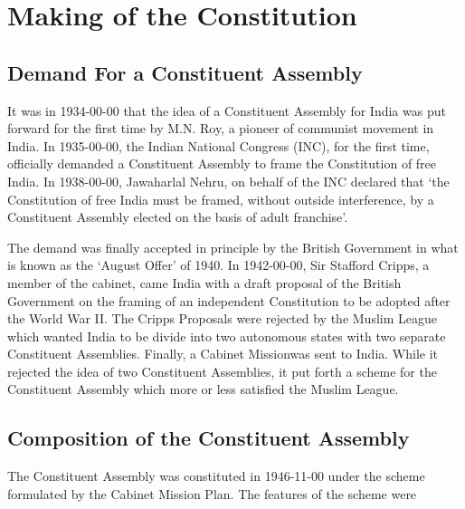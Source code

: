 \chapter{Making of the Constitution}

\begin{multicol}{2}

\section{Demand For a Constituent Assembly}

It was in 1934-00-00 that the idea of a Constituent Assembly for India was put forward for the first time by M.N. Roy, a pioneer of communist movement in India. In 1935-00-00, the Indian National Congress (INC), for the first time, officially demanded a Constituent Assembly to frame the Constitution of free India. In 1938-00-00, Jawaharlal Nehru, on behalf of the INC declared that `the Constitution of free India must be framed, without outside interference, by a Constituent Assembly elected on the basis of adult franchise'.

The demand was finally accepted in principle by the British Government in what is known as the `August Offer' of 1940. In 1942-00-00, Sir Stafford Cripps, a member of the cabinet, came India with a draft proposal of the British Government on the framing of an independent Constitution to be adopted after the World War II. The Cripps Proposals were rejected by the Muslim League which wanted India to be divide into two autonomous states with two separate Constituent Assemblies. Finally, a Cabinet Mission\endnote was sent to India. While it rejected the idea of two Constituent Assemblies, it put forth a scheme for the Constituent Assembly which more or less satisfied the Muslim League.

\section{Composition of the Constituent Assembly}

The Constituent Assembly was constituted in 1946-11-00 under the scheme formulated by the Cabinet Mission Plan. The features of the scheme were


\end{multicol}
